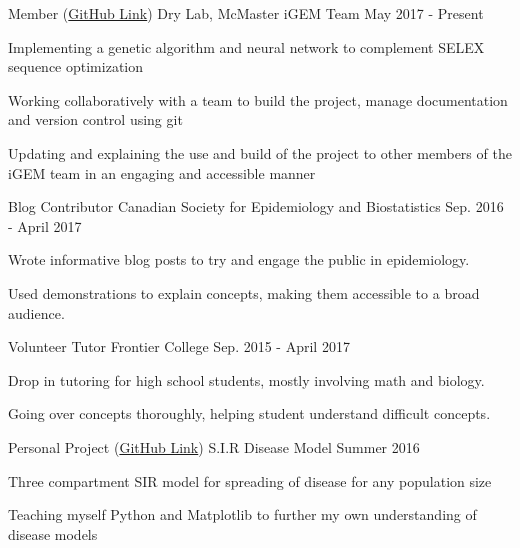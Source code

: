 \begin{cventries}
	\cventry
      {Member (\href{https://github.com/mgem/mgem-drylab-2017}{GitHub Link})}
      {Dry Lab, McMaster iGEM Team}
      {}
      {May 2017 - Present}
      {
        \begin{cvitems}
          \item{Implementing a genetic algorithm and neural network to complement SELEX sequence optimization}
          \item{Working collaboratively with a team to build the project, manage documentation and version control using git}
          \item{Updating and explaining the use and build of the project to other members of the iGEM team in an engaging and accessible manner}
        \end{cvitems}
      }
  \cventry
    {Blog Contributor} %
    {Canadian Society for Epidemiology and Biostatistics}
    {} %
    {Sep. 2016 - April 2017} %
    {
      \begin{cvitems}
        \item{Wrote informative blog posts to try and engage the public in epidemiology.}
        \item{Used demonstrations to explain concepts, making them accessible to a broad audience.}
      \end{cvitems}
    }
  \cventry
    {Volunteer Tutor} %
    {Frontier College}
    {} %
    {Sep. 2015 - April 2017} %
    {
      \begin{cvitems}
        \item{Drop in tutoring for high school students, mostly involving math and biology.}
        \item{Going over concepts thoroughly, helping student understand difficult concepts.}
      \end{cvitems}
    }
\end{cventries}
  \cventry
    {Personal Project (\href{https://github.com/DJSiddharthVader/SIRmodel}{GitHub Link})}
    {S.I.R Disease Model} %
    {} %
    {Summer 2016} %
    {
      \begin{cvitems}
        \item{Three compartment SIR model for spreading of disease for any population size}
        \item{Teaching myself Python and Matplotlib to further my own understanding of disease models}
      \end{cvitems}
}
